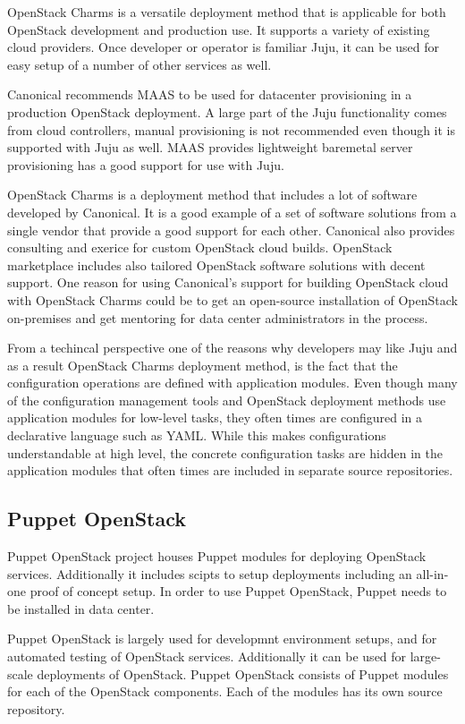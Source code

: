 \documentclass[officiallayout]{tktla}
\begin{document}
OpenStack Charms is a versatile deployment method that is applicable for both
OpenStack development and production use. It supports a variety of existing
cloud providers. Once developer or operator is familiar Juju, it can be used
for easy setup of a number of other services as well.

Canonical recommends MAAS to be used for datacenter provisioning in a
production OpenStack deployment. A large part of the Juju functionality comes
from cloud controllers, manual provisioning is not recommended even though it
is supported with Juju as well. MAAS provides lightweight baremetal server
provisioning has a good support for use with Juju.

OpenStack Charms is a deployment method that includes a lot of software
developed by Canonical. It is a good example of a set of software solutions
from a single vendor that provide a good support for each other. Canonical also
provides consulting and exerice for custom OpenStack cloud builds.  OpenStack
marketplace includes also tailored OpenStack software solutions with decent
support. One reason for using Canonical's support for building OpenStack cloud
with OpenStack Charms could be to get an open-source installation of OpenStack
on-premises and get mentoring for data center administrators in the process.

From a techincal perspective one of the reasons why developers may like Juju
and as a result OpenStack Charms deployment method, is the fact that the
configuration operations are defined with application modules. Even though many
of the configuration management tools and OpenStack deployment methods use
application modules for low-level tasks, they often times are configured in a
declarative language such as YAML. While this makes configurations
understandable at high level, the concrete configuration tasks are hidden in
the application modules that often times are included in separate source
repositories.

\subsection{Puppet OpenStack}

Puppet OpenStack project houses Puppet \cite{puppet-deployment-guide} modules
for deploying OpenStack services. Additionally it includes scipts to setup
deployments including an all-in-one proof of concept setup. In order to use
Puppet OpenStack, Puppet needs to be installed in data center.

Puppet OpenStack is largely used for developmnt environment setups, and for
automated testing of OpenStack services. Additionally it can be used for
large-scale deployments of OpenStack. Puppet OpenStack consists of Puppet
modules for each of the OpenStack components. Each of the modules has its own
source repository.
\end{document}
